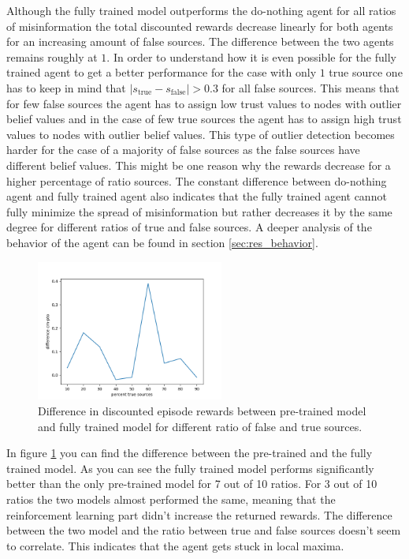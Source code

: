 \documentclass[11pt, a4paper]{article}
\begin{document}
Although the fully trained model outperforms the do-nothing agent for all ratios of misinformation the total discounted rewards decrease linearly for both agents for an increasing amount of false sources. The difference between the two agents remains roughly at $1$. In order to understand how it is even possible for the fully trained agent to get a better performance for the case with only $1$ true source one has to keep in mind that $|s_\text{true}-s_\text{false}| > 0.3$ for all false sources. This means that for few false sources the agent has to assign low trust values to nodes with outlier belief values and in the case of few true sources the agent has to assign high trust values to nodes with outlier belief values. This type of outlier detection becomes harder for the case of a majority of false sources as the false sources have different belief values. This might be one reason why the rewards decrease for a higher percentage of ratio sources. The constant difference between do-nothing agent and fully trained agent also indicates that the fully trained agent cannot fully minimize the spread of misinformation but rather decreases it by the same degree for different ratios of true and false sources. A deeper analysis of the behavior of the agent can be found in section \ref{sec:res_behavior}. \newline

\begin{figure}[h]
	\centering
	\includegraphics[width=0.55\textwidth]{dif_cm-pto.png}
	\caption{\label{fig:dif_cm-pto} Difference in discounted episode rewards between pre-trained model and fully trained model for different ratio of false and true sources.}
\end{figure}

In figure \ref{fig:dif_cm-pto} you can find the difference between the pre-trained and the fully trained model. As you can see the fully trained model performs significantly better than the only pre-trained model for 7 out of 10 ratios. For 3 out of 10 ratios the two models almost performed the same, meaning that the reinforcement learning part didn't increase the returned rewards. The difference between the two model and the ratio between true and false sources doesn't seem to correlate. This indicates that the agent gets stuck in local maxima.
\end{document}

